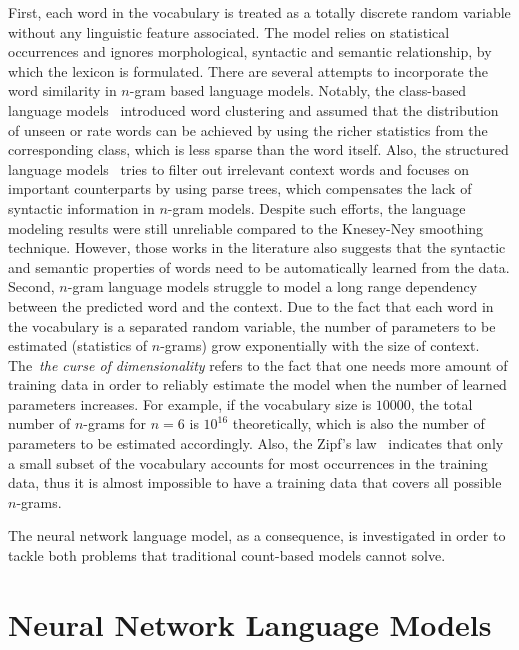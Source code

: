 First, each word in the vocabulary is treated as a totally discrete random variable without any linguistic feature associated. The model relies on statistical occurrences and ignores morphological, syntactic and semantic relationship, by which the lexicon is formulated. There are several attempts to incorporate the word similarity in $n$-gram based language models. Notably, the class-based language models~\cite{brown1992class,niesler1996variable} introduced word clustering and assumed that the distribution of unseen or rate words can be achieved by using the richer statistics from the corresponding class, which is less sparse than the word itself. Also, the structured language models~\cite{chelba2000structured,filimonov2009joint} tries to filter out irrelevant context words and focuses on important counterparts by using parse trees, which compensates the lack of syntactic information in $n$-gram models. Despite such efforts, the language modeling results were still unreliable compared to the Knesey-Ney smoothing technique. However, those works in the literature also suggests that the syntactic and semantic properties of words need to be automatically learned from the data. 
%
Second, $n$-gram language models struggle to model a long range dependency between the predicted word and the context. Due to the fact that each word in the vocabulary is a separated random variable, the number of parameters to be estimated (statistics of $n$-grams) grow exponentially with the size of context. The~\textit{the curse of dimensionality} refers to the fact that one needs more amount of training data in order to reliably estimate the model when the number of learned parameters increases. For example, if the vocabulary size is $10000$, the total number of $n$-grams for $n=6$ is $10^16$ theoretically, which is also the number of parameters to be estimated accordingly. Also, the Zipf's law~\cite{kingsley1932selective} indicates that only a small subset of the vocabulary accounts for most occurrences in the training data, thus it is almost impossible to have a training data that covers all possible $n$-grams. 

The neural network language model, as a consequence, is investigated in order to tackle both problems that traditional count-based models cannot solve. 


\section{Neural Network Language Models}

